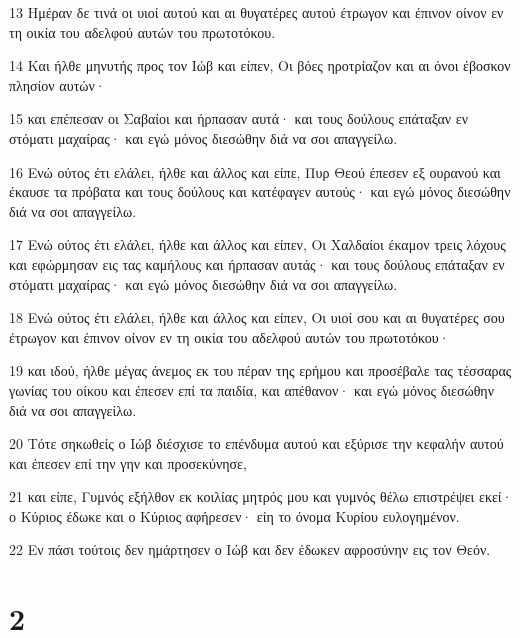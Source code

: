 \par 13 Ημέραν δε τινά οι υιοί αυτού και αι θυγατέρες αυτού έτρωγον και έπινον οίνον εν τη οικία του αδελφού αυτών του πρωτοτόκου.
\par 14 Και ήλθε μηνυτής προς τον Ιώβ και είπεν, Οι βόες ηροτρίαζον και αι όνοι έβοσκον πλησίον αυτών·
\par 15 και επέπεσαν οι Σαβαίοι και ήρπασαν αυτά· και τους δούλους επάταξαν εν στόματι μαχαίρας· και εγώ μόνος διεσώθην διά να σοι απαγγείλω.
\par 16 Ενώ ούτος έτι ελάλει, ήλθε και άλλος και είπε, Πυρ Θεού έπεσεν εξ ουρανού και έκαυσε τα πρόβατα και τους δούλους και κατέφαγεν αυτούς· και εγώ μόνος διεσώθην διά να σοι απαγγείλω.
\par 17 Ενώ ούτος έτι ελάλει, ήλθε και άλλος και είπεν, Οι Χαλδαίοι έκαμον τρεις λόχους και εφώρμησαν εις τας καμήλους και ήρπασαν αυτάς· και τους δούλους επάταξαν εν στόματι μαχαίρας· και εγώ μόνος διεσώθην διά να σοι απαγγείλω.
\par 18 Ενώ ούτος έτι ελάλει, ήλθε και άλλος και είπεν, Οι υιοί σου και αι θυγατέρες σου έτρωγον και έπινον οίνον εν τη οικία του αδελφού αυτών του πρωτοτόκου·
\par 19 και ιδού, ήλθε μέγας άνεμος εκ του πέραν της ερήμου και προσέβαλε τας τέσσαρας γωνίας του οίκου και έπεσεν επί τα παιδία, και απέθανον· και εγώ μόνος διεσώθην διά να σοι απαγγείλω.
\par 20 Τότε σηκωθείς ο Ιώβ διέσχισε το επένδυμα αυτού και εξύρισε την κεφαλήν αυτού και έπεσεν επί την γην και προσεκύνησε,
\par 21 και είπε, Γυμνός εξήλθον εκ κοιλίας μητρός μου και γυμνός θέλω επιστρέψει εκεί· ο Κύριος έδωκε και ο Κύριος αφήρεσεν· είη το όνομα Κυρίου ευλογημένον.
\par 22 Εν πάσι τούτοις δεν ημάρτησεν ο Ιώβ και δεν έδωκεν αφροσύνην εις τον Θεόν.

\chapter{2}

